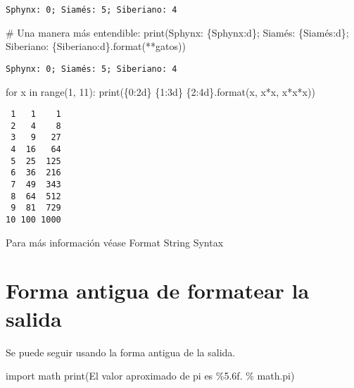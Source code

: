 \documentclass[
  letterpaper,
  DIV=11,
  numbers=noendperiod]{scrreprt}
\newenvironment{Shaded}{\begin{snugshade}}{\end{snugshade}}
\newcommand{\BuiltInTok}[1]{\textcolor[rgb]{0.00,0.23,0.31}{#1}}
\newcommand{\CommentTok}[1]{\textcolor[rgb]{0.37,0.37,0.37}{#1}}
\newcommand{\ControlFlowTok}[1]{\textcolor[rgb]{0.00,0.23,0.31}{#1}}
\newcommand{\DecValTok}[1]{\textcolor[rgb]{0.68,0.00,0.00}{#1}}
\newcommand{\ImportTok}[1]{\textcolor[rgb]{0.00,0.46,0.62}{#1}}
\newcommand{\KeywordTok}[1]{\textcolor[rgb]{0.00,0.23,0.31}{#1}}
\newcommand{\NormalTok}[1]{\textcolor[rgb]{0.00,0.23,0.31}{#1}}
\newcommand{\OperatorTok}[1]{\textcolor[rgb]{0.37,0.37,0.37}{#1}}
\newcommand{\SpecialCharTok}[1]{\textcolor[rgb]{0.37,0.37,0.37}{#1}}
\newcommand{\StringTok}[1]{\textcolor[rgb]{0.13,0.47,0.30}{#1}}
\begin{document}
\begin{verbatim}
Sphynx: 0; Siamés: 5; Siberiano: 4
\end{verbatim}

\begin{Shaded}
\begin{Highlighting}[]
\CommentTok{\# Una manera más entendible:}
\BuiltInTok{print}\NormalTok{(}\StringTok{\textquotesingle{}Sphynx: }\SpecialCharTok{\{Sphynx:d\}}\StringTok{; Siamés: \{Siamés:d\}; Siberiano: }\SpecialCharTok{\{Siberiano:d\}}\StringTok{\textquotesingle{}}\NormalTok{.}\BuiltInTok{format}\NormalTok{(}\OperatorTok{**}\NormalTok{gatos))}
\end{Highlighting}
\end{Shaded}

\begin{verbatim}
Sphynx: 0; Siamés: 5; Siberiano: 4
\end{verbatim}

\begin{Shaded}
\begin{Highlighting}[]
\ControlFlowTok{for}\NormalTok{ x }\KeywordTok{in} \BuiltInTok{range}\NormalTok{(}\DecValTok{1}\NormalTok{, }\DecValTok{11}\NormalTok{):}
    \BuiltInTok{print}\NormalTok{(}\StringTok{\textquotesingle{}}\SpecialCharTok{\{0:2d\}}\StringTok{ }\SpecialCharTok{\{1:3d\}}\StringTok{ }\SpecialCharTok{\{2:4d\}}\StringTok{\textquotesingle{}}\NormalTok{.}\BuiltInTok{format}\NormalTok{(x, x}\OperatorTok{*}\NormalTok{x, x}\OperatorTok{*}\NormalTok{x}\OperatorTok{*}\NormalTok{x))}
\end{Highlighting}
\end{Shaded}

\begin{verbatim}
 1   1    1
 2   4    8
 3   9   27
 4  16   64
 5  25  125
 6  36  216
 7  49  343
 8  64  512
 9  81  729
10 100 1000
\end{verbatim}

Para más información véase Format String Syntax

\section{Forma antigua de formatear la
salida}\label{forma-antigua-de-formatear-la-salida}

Se puede seguir usando la forma antigua de la salida.

\begin{Shaded}
\begin{Highlighting}[]
\ImportTok{import}\NormalTok{ math}
\BuiltInTok{print}\NormalTok{(}\StringTok{\textquotesingle{}El valor aproximado de pi es }\SpecialCharTok{\%5.6f}\StringTok{.\textquotesingle{}} \OperatorTok{\%}\NormalTok{ math.pi)}
\end{Highlighting}
\end{Shaded}
\end{document}
